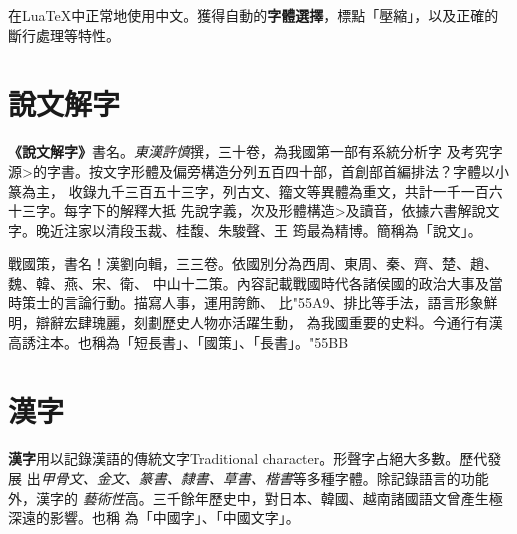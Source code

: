 \documentclass{article}
\begin{document}
在Lua\TeX{}中正常地使用中文。獲得自動的\textbf{字體選擇}，標點「壓縮」，以及正確的斷行處理等特性。
\section{說文解字}
\textbf{《說文解字》}書名。\textit{東漢許慎}撰，三十卷，為我國第一部有系統分析字
及考究字源>的字書。按文字形體及偏旁構造分列五百四十部，首創部首編排法？字體以小篆為主，
收錄九千三百五十三字，列古文、籀文等異體為重文，共計一千一百六十三字。每字下的解釋大抵
先說字義，次及形體構造>及讀音，依據六書解說文字。晚近注家以清段玉裁、桂馥、朱駿聲、王
筠最為精博。簡稱為「說文」。

戰國策，書名！漢劉向輯，三三卷。依國別分為西周、東周、秦、齊、楚、趙、魏、韓、燕、宋、衛、
中山十二策。內容記載戰國時代各諸侯國的政治大事及當時策士的言論行動。描寫人事，運用誇飾、
比{\Uchar"55A9}、排比等手法，語言形象鮮明，辯辭宏肆瑰麗，刻劃歷史人物亦活躍生動，
為我國重要的史料。今通行有漢高誘注本。也稱為「短長書」、「國策」、「長書」。{\Uchar"55BB}
\section{漢字}
\textbf{漢字}用以記錄漢語的傳統文字Traditional character。形聲字占絕大多數。歷代發展
出\textit{甲骨文、金文、篆書、隸書、草書、楷書}等多種字體。除記錄語言的功能外，漢字的
\emph{藝術性}高。三千餘年歷史中，對日本、韓國、越南諸國語文曾產生極深遠的影響。也稱
為「中國字」、「中國文字」。
\end{document}
